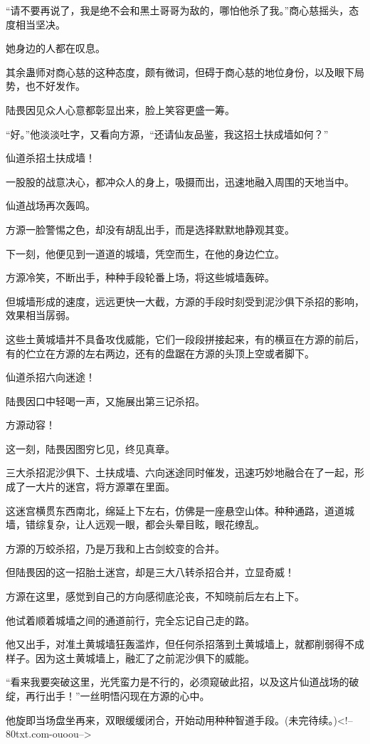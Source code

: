 \begin{this_body}
“请不要再说了，我是绝不会和黑土哥哥为敌的，哪怕他杀了我。”商心慈摇头，态度相当坚决。

她身边的人都在叹息。

其余蛊师对商心慈的这种态度，颇有微词，但碍于商心慈的地位身份，以及眼下局势，也不好发作。

陆畏因见众人心意都彰显出来，脸上笑容更盛一筹。

“好。”他淡淡吐字，又看向方源，“还请仙友品鉴，我这招土扶成墙如何？”

仙道杀招土扶成墙！

一股股的战意决心，都冲众人的身上，吸摄而出，迅速地融入周围的天地当中。

仙道战场再次轰鸣。

方源一脸警惕之色，却没有胡乱出手，而是选择默默地静观其变。

下一刻，他便见到一道道的城墙，凭空而生，在他的身边伫立。

方源冷笑，不断出手，种种手段轮番上场，将这些城墙轰碎。

但城墙形成的速度，远远更快一大截，方源的手段时刻受到泥沙俱下杀招的影响，效果相当孱弱。

这些土黄城墙并不具备攻伐威能，它们一段段拼接起来，有的横亘在方源的前后，有的伫立在方源的左右两边，还有的盘踞在方源的头顶上空或者脚下。

仙道杀招六向迷途！

陆畏因口中轻喝一声，又施展出第三记杀招。

方源动容！

这一刻，陆畏因图穷匕见，终见真章。

三大杀招泥沙俱下、土扶成墙、六向迷途同时催发，迅速巧妙地融合在了一起，形成了一大片的迷宫，将方源罩在里面。

这迷宫横贯东西南北，绵延上下左右，仿佛是一座悬空山体。种种通路，道道城墙，错综复杂，让人远观一眼，都会头晕目眩，眼花缭乱。

方源的万蛟杀招，乃是万我和上古剑蛟变的合并。

但陆畏因的这一招胎土迷宫，却是三大八转杀招合并，立显奇威！

方源在这里，感觉到自己的方向感彻底沦丧，不知晓前后左右上下。

他试着顺着城墙之间的通道前行，完全忘记自己走的路。

他又出手，对准土黄城墙狂轰滥炸，但任何杀招落到土黄城墙上，就都削弱得不成样子。因为这土黄城墙上，融汇了之前泥沙俱下的威能。

“看来我要突破这里，光凭蛮力是不行的，必须窥破此招，以及这片仙道战场的破绽，再行出手！”一丝明悟闪现在方源的心中。

他旋即当场盘坐再来，双眼缓缓闭合，开始动用种种智道手段。(未完待续。)<!--80txt.com-ouoou-->

\end{this_body}


